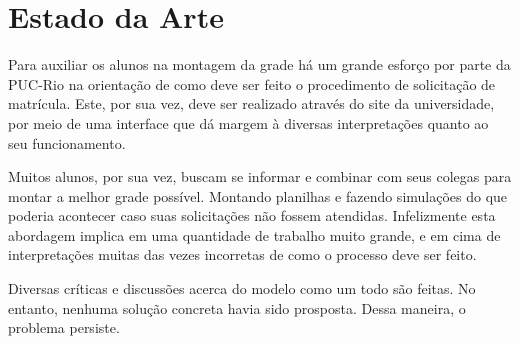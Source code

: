 
\chapter{Estado da Arte}

Para auxiliar os alunos na montagem da grade há um grande esforço por parte da PUC-Rio na orientação de como deve ser feito o procedimento de solicitação de matrícula. Este, por sua vez, deve ser realizado através do site da universidade, por meio de uma interface que dá margem à diversas interpretações quanto ao seu funcionamento.

Muitos alunos, por sua vez, buscam se informar e combinar com seus colegas para montar a melhor grade possível. Montando planilhas e fazendo simulações do que poderia acontecer caso suas solicitações não fossem atendidas. Infelizmente esta abordagem implica em uma quantidade de trabalho muito grande, e em cima de interpretações muitas das vezes incorretas de como o processo deve ser feito.

Diversas críticas e discussões acerca do modelo como um todo são feitas. No entanto, nenhuma solução concreta havia sido prosposta. Dessa maneira, o problema persiste.

